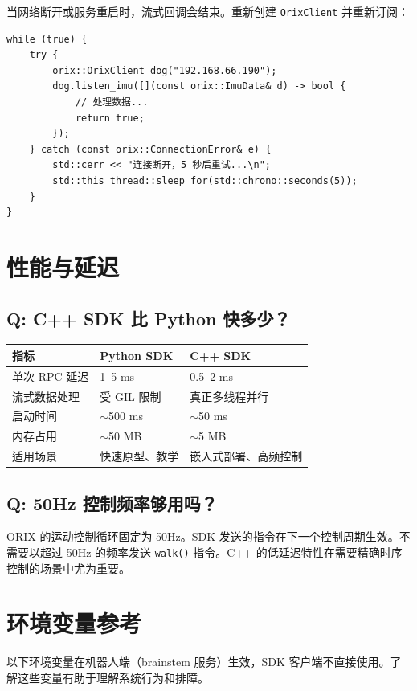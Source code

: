 \documentclass[a4paper,11pt,openany]{book}
\begin{document}
当网络断开或服务重启时，流式回调会结束。重新创建 \texttt{OrixClient} 并重新订阅：

\begin{lstlisting}[style=cpp]
while (true) {
    try {
        orix::OrixClient dog("192.168.66.190");
        dog.listen_imu([](const orix::ImuData& d) -> bool {
            // 处理数据...
            return true;
        });
    } catch (const orix::ConnectionError& e) {
        std::cerr << "连接断开，5 秒后重试...\n";
        std::this_thread::sleep_for(std::chrono::seconds(5));
    }
}
\end{lstlisting}

\section{性能与延迟}

\subsection{Q: C++ SDK 比 Python 快多少？}

\begin{longtable}{lll}
\toprule
指标 & Python SDK & C++ SDK \\
\midrule
\endhead
单次 RPC 延迟 & 1--5 ms & 0.5--2 ms \\
流式数据处理 & 受 GIL 限制 & 真正多线程并行 \\
启动时间 & $\sim$500 ms & $\sim$50 ms \\
内存占用 & $\sim$50 MB & $\sim$5 MB \\
适用场景 & 快速原型、教学 & 嵌入式部署、高频控制 \\
\bottomrule
\end{longtable}

\subsection{Q: 50Hz 控制频率够用吗？}

ORIX 的运动控制循环固定为 50Hz。SDK 发送的指令在下一个控制周期生效。不需要以超过 50Hz 的频率发送 \texttt{walk()} 指令。C++ 的低延迟特性在需要精确时序控制的场景中尤为重要。

\section{环境变量参考}

以下环境变量在机器人端（brainstem 服务）生效，SDK 客户端不直接使用。了解这些变量有助于理解系统行为和排障。
\end{document}
